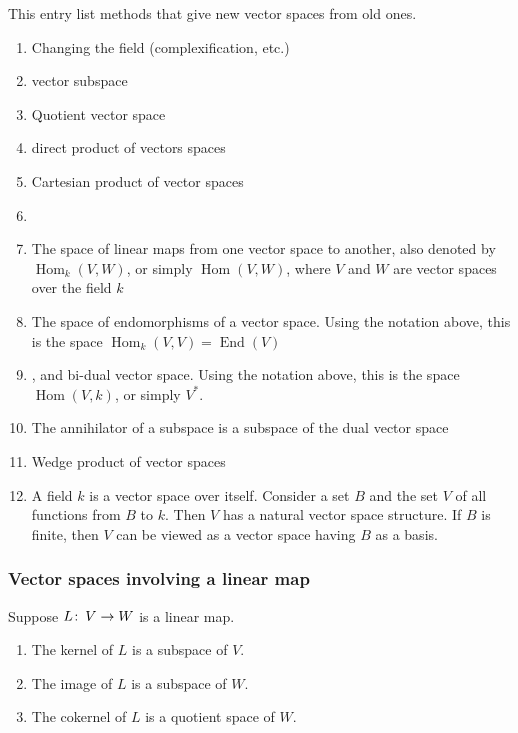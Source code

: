 \documentclass[12pt]{article}
\begin{document}
This entry list methods that give new vector spaces from old ones.

\begin{enumerate}
\item Changing the field (complexification, etc.)
\item vector subspace
\item Quotient vector space
\item direct product of vectors spaces
\item Cartesian product of vector spaces
\item {}
\item The space of linear maps from one vector space to another, also denoted by $\operatorname{Hom}_k(V,W)$, or simply $\operatorname{Hom}(V,W)$, where $V$ and $W$ are vector spaces over the field $k$
\item The space of endomorphisms of a vector space.  Using the notation above, this is the space $\operatorname{Hom}_k(V,V)=\operatorname{End}(V)$
\item {}, and bi-dual vector space.  Using the notation above, this is the space $\operatorname{Hom}(V,k)$, or simply $V^*$.
\item The annihilator of a subspace is a subspace of the dual vector space
\item Wedge product of vector spaces
\item A field $k$ is a vector space over itself.  Consider a set $B$ and the set $V$ of all functions from $B$ to $k$.  Then $V$ has a natural vector space structure.  If $B$ is finite, then $V$ can be viewed as a vector space having $B$ as a basis.
\end{enumerate}

\subsubsection*{Vector spaces involving a linear map}

Suppose $L\colon\thinspace V\to W$ is a linear map.

\begin{enumerate}
\item The kernel of $L$ is a subspace of $V$.
\item The image of $L$ is a subspace of $W$.
\item The cokernel of $L$ is a quotient space of $W$. 
\end{enumerate}
\end{document}
